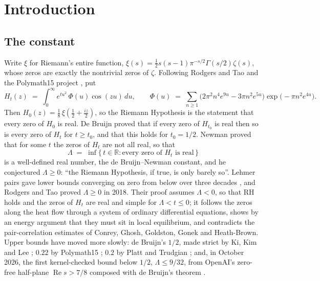\documentclass[11pt]{article}
\theoremstyle{definition}
\newcommand{\Lam}{\Lambda}
\newcommand{\Hfun}{H}
\newcommand{\re}{\operatorname{Re}}
\newcommand{\R}{\mathbb{R}}
\begin{document}
\section{Introduction}

\subsection{The constant}

Write $\xi$ for Riemann's entire function, $\xi(s) = \tfrac12 s(s-1)\pi^{-s/2}\Gamma(s/2)\zeta(s)$, whose zeros are exactly the nontrivial zeros of $\zeta$. Following Rodgers and Tao \cite{RT} and the Polymath15 project \cite{P15}, put
\begin{equation}\label{eq:H}
\Hfun_t(z) \;=\; \int_0^\infty e^{t u^2}\,\Phi(u)\cos(zu)\,du,
\qquad
\Phi(u) \;=\; \sum_{n \ge 1}\bigl(2\pi^2 n^4 e^{9u} - 3\pi n^2 e^{5u}\bigr)\exp\!\bigl(-\pi n^2 e^{4u}\bigr).
\end{equation}
Then $\Hfun_0(z) = \tfrac18\,\xi\!\left(\tfrac12 + \tfrac{iz}{2}\right)$, so the Riemann Hypothesis is the statement that every zero of $\Hfun_0$ is real. De Bruijn \cite{dB} proved that if every zero of $\Hfun_{t_0}$ is real then so is every zero of $\Hfun_t$ for $t \ge t_0$, and that this holds for $t_0 = 1/2$. Newman \cite{Ne} proved that for some $t$ the zeros of $\Hfun_t$ are not all real, so that
\[
\Lam \;=\; \inf\{\,t \in \R : \text{every zero of } \Hfun_t \text{ is real}\,\}
\]
is a well-defined real number, the de Bruijn--Newman constant, and he conjectured $\Lam \ge 0$: ``the Riemann Hypothesis, if true, is only barely so''. Lehmer pairs gave lower bounds converging on zero from below over three decades \cite{CNV,CSV,Od,SGD}, and Rodgers and Tao \cite{RT} proved $\Lam \ge 0$ in 2018. Their proof assumes $\Lam < 0$, so that RH holds and the zeros of $\Hfun_t$ are real and simple for $\Lam < t \le 0$; it follows the zeros along the heat flow through a system of ordinary differential equations, shows by an energy argument that they must sit in local equilibrium, and contradicts the pair-correlation estimates of Conrey, Ghosh, Goldston, Gonek and Heath-Brown. Upper bounds have moved more slowly: de Bruijn's $1/2$, made strict by Ki, Kim and Lee \cite{KKL}; $0.22$ by Polymath15 \cite{P15}; $0.2$ by Platt and Trudgian \cite{PT}; and, in October 2026, the first kernel-checked bound below $1/2$, $\Lam \le 9/32$, from OpenAI's zero-free half-plane $\re s > 7/8$ \cite{OAIqrh} composed with de Bruijn's theorem \cite{Murphy932}.
\end{document}
